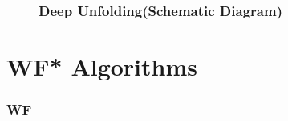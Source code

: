 \documentclass{beamer}
\theoremstyle{definition}
\theoremstyle{remark}
\begin{document}
\begin{frame}
  \begin{figure}
    \frametitle{Deep Unfolding(Schematic Diagram)}
    \centering
    \resizebox{1.0\textwidth}{!}{}
    \label{fig:deep_unfolding}
  \end{figure}
\end{frame}

\section[WF* Algorithms]{WF* Algorithms}
\begin{frame}
  \frametitle{WF}


\end{frame}








\end{document}
